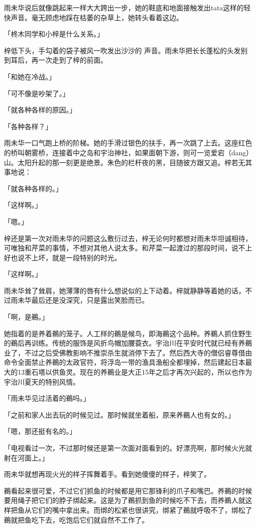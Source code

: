 \documentclass[UTF8]{ctexart}
\begin{document}
    雨未华说后就像跳起来一样大大跨出一步，她的鞋底和地面接触发出tata这样的轻快声音。毫无顾虑地踩在枯萎的杂草上，她转头看着这边。

    「柊木同学和小梓是什么关系。」

    梓低下头，手勾着的袋子被风一吹发出沙沙的 声音。雨未华把长长蓬松的头发别到耳后，再一次走到了梓的前面。

    「和她在冷战。」

    「可不像是吵架了。」

    「就各种各样的原因。」

    「各种各样？」

    雨未华一口气跑上桥的阶梯。她的手滑过银色的扶手，再一次跳了上去。这座红色的桥叫朝雾桥，连接着中之岛和宇治神社，如果面朝下游，则可一览爱宕（dang）山。太阳升起的那一刻更是绝景。朱色的栏杆夜的黑，目随彼方跟又追。梓若无其事地说：

    「就各种各样的。」

    「这样啊。」

    「嗯。」

    梓还是第一次对雨未华的问题这么敷衍过去，梓无论何时都想对雨未华坦诚相待，可唯独和芹菜的事情，不想对其他人说太多。和芹菜一起渡过的那段时间，说不上好也说不上坏，就是一段特别的时光。

    「这样啊。」

    雨未华耸了耸肩，她薄薄的唇有什么想说似的上下动着。梓就静静等着她的话，不过雨未华最后还是没深究，只是露出笑脸而已。

    「啊，是鵜。」

    她指着的是养着鵜的笼子。人工样的鵜是候鸟，即海鵜这个品种。养鵜人抓住野生的鵜后再训练。传统的服饰是风折鸟帽加腰蓑衣。宇治川在平安时代就已经有养鵜业了，不过之后受佛教影响不推崇杀生就消停下去了。然后西大寺的僧侣睿尊借由命令全面禁止养鵜的太政官符，将浮岛一带的渔具渔船全都埋掉，然后建起日本最大的13重石塔以供鱼灵。现在的养鵜业是大正15年之后才再次兴起的，所以也作为宇治川夏天的特别风情。

    「雨未华见过活着的鵜吗。」

    「之前和家人出去玩的时候见过。那时候就坐着船，原来养鵜人也有女的。」

    「嗯，那还挺有名的。」

    「电视看过一次，不过那时候还是第一次面对面看到的。好漂亮啊，那时候火光就射在河面上。」

    雨未华就想再现火光的样子挥舞着手。看到她傻傻的样子，梓笑了。

    鵜看起来很可爱，不过它们抓鱼的时候都是用它那锋利的爪子和嘴巴。养鵜的时候要用绳子把它们的脖子绑起来。这是为了鵜抓到鱼的时候吃不下去，而养鵜人就这样把鱼从它们的嘴中拿出来。而绑的松紧也很讲究，绑紧了鵜就呼吸不了，绑松了鵜就把鱼吃下去，吃饱后它们就自然不工作了。
\end{document}
